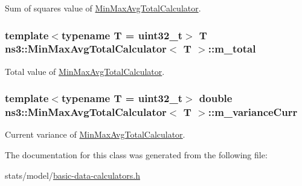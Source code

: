 Sum of squares value of \hyperlink{classns3_1_1MinMaxAvgTotalCalculator}{Min\+Max\+Avg\+Total\+Calculator}. 

\subsubsection[{\texorpdfstring{m\+\_\+total}{m_total}}]{\setlength{\rightskip}{0pt plus 5cm}template$<$typename T = uint32\+\_\+t$>$ T {\bf ns3\+::\+Min\+Max\+Avg\+Total\+Calculator}$<$ T $>$\+::m\+\_\+total\hspace{0.3cm}{\ttfamily [protected]}}\hypertarget{classns3_1_1MinMaxAvgTotalCalculator_ad6b9ad4019cc7156bde6692d6b898c6a}{}\label{classns3_1_1MinMaxAvgTotalCalculator_ad6b9ad4019cc7156bde6692d6b898c6a}


Total value of \hyperlink{classns3_1_1MinMaxAvgTotalCalculator}{Min\+Max\+Avg\+Total\+Calculator}. 

\subsubsection[{\texorpdfstring{m\+\_\+variance\+Curr}{m_varianceCurr}}]{\setlength{\rightskip}{0pt plus 5cm}template$<$typename T = uint32\+\_\+t$>$ double {\bf ns3\+::\+Min\+Max\+Avg\+Total\+Calculator}$<$ T $>$\+::m\+\_\+variance\+Curr\hspace{0.3cm}{\ttfamily [protected]}}\hypertarget{classns3_1_1MinMaxAvgTotalCalculator_a11c6ec89fb897ab33c4dc6169739fbfd}{}\label{classns3_1_1MinMaxAvgTotalCalculator_a11c6ec89fb897ab33c4dc6169739fbfd}


Current variance of \hyperlink{classns3_1_1MinMaxAvgTotalCalculator}{Min\+Max\+Avg\+Total\+Calculator}. 



The documentation for this class was generated from the following file\+:\begin{DoxyCompactItemize}
\item 
stats/model/\hyperlink{basic-data-calculators_8h}{basic-\/data-\/calculators.\+h}\end{DoxyCompactItemize}
